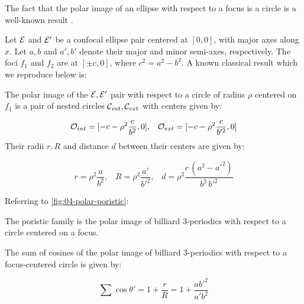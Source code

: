 The fact that the polar image of an ellipse with respect to a focus is a circle is a well-known result \cite{akopyan2007-conics}.

Let $\mathcal{E}$ and $\mathcal{E}'$ be a confocal ellipse pair centered at $[0,0]$, with major axes along $x$. Let $a,b$ and $a',b'$ denote their major and minor semi-axes, respectively. The foci $f_1$ and $f_2$ are at $[\pm c,0]$, where $c^2=a^2-b^2$. A known classical result which we reproduce below is:

\begin{lemma}
The polar image of the $\mathcal{E},\mathcal{E}'$ pair with respect to a circle of radius $\rho$ centered on $f_1$ is a pair of nested circles $\mathcal{C}_{int},\mathcal{C}_{ext}$ with centers given by:

\[\mathcal{O}_{int}=[-c-\rho^2\frac{c}{b^2},0],\;\;\;\mathcal{O}_{ext}=[-c-\rho^2\frac{c}{b'^2},0]\]
Their radii $r,R$ and distance $d$ between their centers are given by: 

\[ r=\rho^2\frac{a}{b^2},\;\;\;R=\rho^2\frac{a'}{b'^2},\;\;\; d=\rho^2\frac{ c\, (a^2 - {a'}^2)}{b^2\, {b'}^2} \]
\end{lemma}


 
Referring to \cref{fig:04-polar-poristic}:

\begin{corollary}
The poristic family is the polar image of billiard 3-periodics with respect to a circle centered on a focus. 
\end{corollary}

\begin{corollary}
The sum of cosines of the polar image of billiard 3-periodics with respect to a focus-centered circle is given by:

\begin{equation}
\sum\cos\theta' = 1+\frac{r}{R} = 1+\frac{a b'^2}{a' b^2}
\label{eq:04-bic-cos}
\end{equation}
\end{corollary}

